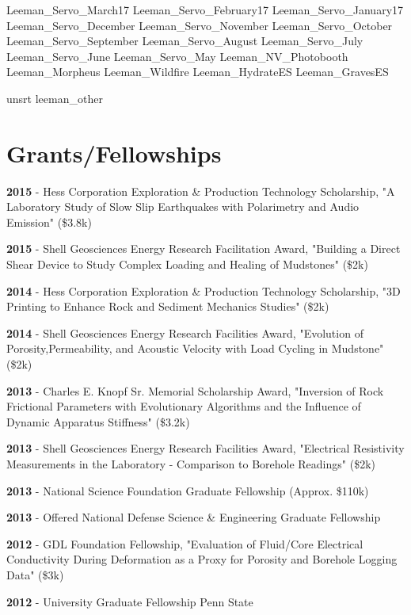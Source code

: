 \documentclass[letterpaper]{article}
\renewenvironment{itemize}{
  \begin{list}{}{
    \setlength{\leftmargin}{1.5em}
  }
}{
  \end{list}
}
\begin{document}
\nocite{other}{Leeman_Servo_March17}
\nocite{other}{Leeman_Servo_February17}
\nocite{other}{Leeman_Servo_January17}
\nocite{other}{Leeman_Servo_December}
\nocite{other}{Leeman_Servo_November}
\nocite{other}{Leeman_Servo_October}
\nocite{other}{Leeman_Servo_September}
\nocite{other}{Leeman_Servo_August}
\nocite{other}{Leeman_Servo_July}
\nocite{other}{Leeman_Servo_June}
\nocite{other}{Leeman_Servo_May}
\nocite{other}{Leeman_NV_Photobooth}
\nocite{other}{Leeman_Morpheus}
\nocite{other}{Leeman_Wildfire}
\nocite{other}{Leeman_HydrateES}
\nocite{other}{Leeman_GravesES}

{unsrt}
{leeman_other}{}
\endgroup


\section*{Grants/Fellowships}
\begin{itemize}
\item \textbf{2015} - Hess Corporation Exploration \& Production Technology Scholarship, "A Laboratory Study of Slow Slip Earthquakes with Polarimetry and Audio Emission" (\$3.8k)
\item \textbf{2015} - Shell Geosciences Energy Research Facilitation Award, "Building a Direct Shear Device to Study Complex Loading and Healing of Mudstones" (\$2k)
\item \textbf{2014} - Hess Corporation Exploration \& Production Technology Scholarship, "3D Printing to Enhance Rock and Sediment Mechanics Studies" (\$2k)
\item \textbf{2014} - Shell Geosciences Energy Research Facilities Award, "Evolution of Porosity,Permeability, and Acoustic Velocity with Load Cycling in Mudstone" (\$2k)
\item \textbf{2013} - Charles E. Knopf Sr. Memorial Scholarship Award, "Inversion of Rock Frictional Parameters with Evolutionary Algorithms and the Influence of Dynamic Apparatus Stiffness" (\$3.2k)
\item \textbf{2013} - Shell Geosciences Energy Research Facilities Award, "Electrical Resistivity Measurements in the Laboratory - Comparison to Borehole Readings" (\$2k)
\item \textbf{2013} - National Science Foundation Graduate Fellowship (Approx. \$110k)
\item \textbf{2013} - Offered National Defense Science \& Engineering Graduate Fellowship
\item \textbf{2012} - GDL Foundation Fellowship, "Evaluation of Fluid/Core Electrical Conductivity During Deformation as a Proxy for Porosity and Borehole Logging Data" (\$3k)
\item \textbf{2012} - University Graduate Fellowship Penn State
\end{itemize}
\end{document}
